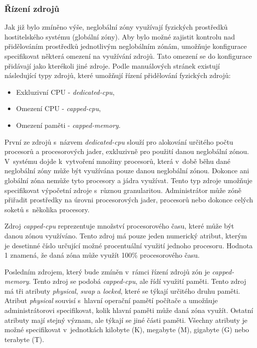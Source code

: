 \subsubsection{Řízení zdrojů}
\label{chapter:zones:configuration:resources:resource_control}
Jak již bylo zmíněno výše, neglobální zóny využívají fyzických prostředků hostitelského systému (globální zóny). Aby bylo
možné zajistit kontrolu nad přidělováním prostředků jednotlivým neglobálním zónám, umožňuje konfigurace specifikovat některá
omezení na využívání zdrojů. Tato omezení se do konfigurace přidávají jako kterékoli jiné zdroje. Podle manuálových stránek
\cite{oracle:manpages:zonecfg} existují následující typy zdrojů, které umožňují řízení přidělování fyzických zdrojů:
\begin{itemize}
 \item Exkluzivní CPU - \textit{dedicated-cpu},
 \item Omezení CPU - \textit{capped-cpu},
 \item Omezení paměti - \textit{capped-memory}.
\end{itemize}
První ze zdrojů s~názvem \textit{dedicated-cpu} slouží pro alokování určitého počtu procesorů a procesorových jader, exkluzivně
pro použití danou neglobální zónou. V~systému dojde k~vytvoření množiny procesorů, která v~době běhu dané neglobální zóny
může být využívána pouze danou neglobální zónou. Dokonce ani globální zóna nemůže tyto procesory a jádra využívat. Tento typ
zdroje umožňuje specifikovat výpočetní zdroje s~různou granularitou. Administrátor může zóně přiřadit prostředky na úrovni 
procesorových jader, procesorů nebo dokonce celých soketů s~několika procesory.

Zdroj \textit{capped-cpu} reprezentuje množství procesorového času, které může být danou zónou využíváno. Tento zdroj má pouze
jeden numerický atribut, kterým je desetinné číslo určující možné procentuální využití jednoho procesoru. Hodnota 1 znamená,
že daná zóna může využít 100\% procesorového času.

Posledním zdrojem, který bude zmíněn v~rámci řízení zdrojů zón je \textit{capped-memory}. Tento zdroj se podobá \textit{capped-cpu},
ale řídí využití paměti. Tento zdroj má tři atributy \textit{physical}, \textit{swap} a \textit{locked}, které se týkají určitého
druhu paměti. Atribut \textit{physical} souvisí s~hlavní operační pamětí počítače a umožňuje administrátorovi specifikovat,
kolik hlavní paměti může daná zóna využít. Ostatní atributy mají stejný význam, ale týkají se jiné části paměti. Všechny 
atributy je možné specifikovat v~jednotkách kilobyte (K), megabyte (M), gigabyte (G) nebo terabyte (T).
